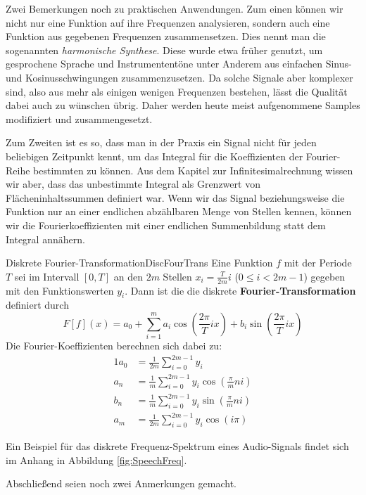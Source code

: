 Zwei Bemerkungen noch zu praktischen Anwendungen. Zum einen können wir nicht nur eine Funktion auf ihre Frequenzen analysieren, sondern auch eine Funktion aus gegebenen Frequenzen zusammensetzen. Dies nennt man die sogenannten \emph{harmonische Synthese}. Diese wurde etwa früher genutzt, um gesprochene Sprache und Instrumententöne unter Anderem aus einfachen Sinus- und Kosinusschwingungen zusammenzusetzen. Da solche Signale aber komplexer sind, also aus mehr als einigen wenigen Frequenzen bestehen, lässt die Qualität dabei auch zu wünschen übrig. Daher werden heute meist aufgenommene Samples modifiziert und zusammengesetzt.

Zum Zweiten ist es so, dass man in der Praxis ein Signal nicht für jeden beliebigen Zeitpunkt kennt, um das Integral für die Koeffizienten der Fourier-Reihe bestimmten zu können. Aus dem Kapitel zur Infinitesimalrechnung wissen wir aber, dass das unbestimmte Integral als Grenzwert von Flächeninhaltssummen definiert war. Wenn wir das Signal beziehungsweise die Funktion nur an einer endlichen abzählbaren Menge von Stellen kennen, können wir die Fourierkoeffizienten mit einer endlichen Summenbildung statt dem Integral annähern.

\begin{definition}{Diskrete Fourier-Transformation}{DiscFourTrans}
    Eine Funktion $f$ mit der Periode $T$ sei im Intervall $[0, T]$ an den $2m$ Stellen $x_i = \frac{T}{2m} i$ ($0\le i < 2m-1$) gegeben mit den Funktionswerten $y_i$. Dann ist die die diskrete \textbf{Fourier-Transformation} definiert durch
    $$
        F[f](x) = a_0 + \sum\limits_{i=1}^m a_i \cos(\frac{2\pi}{T}ix) + b_i \sin(\frac{2\pi}{T}ix)
    $$
    Die Fourier-Koeffizienten berechnen sich dabei zu:
    \begin{alignat*}{1}
        a_0 &= \frac{1}{2m} \sum\limits_{i=0}^{2m-1} y_i  \\
        a_n &= \frac{1}{m} \sum\limits_{i=0}^{2m-1} y_i \cos(\frac{\pi}{m} ni) \\
        b_n &= \frac{1}{m} \sum\limits_{i=0}^{2m-1} y_i \sin(\frac{\pi}{m} ni) \\
        a_m &= \frac{1}{2m} \sum\limits_{i=0}^{2m-1} y_i \cos(i\pi)
    \end{alignat*}
\end{definition}

Ein Beispiel für das diskrete Frequenz-Spektrum eines Audio-Signals findet sich im Anhang in Abbildung \ref{fig:SpeechFreq}.

Abschließend seien noch zwei Anmerkungen gemacht.


